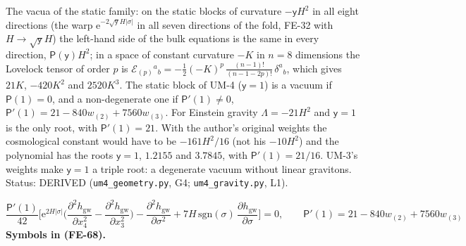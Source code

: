 \documentclass[
  10pt,
]{article}
\begin{document}
The vacua of the static family: on the static blocks of curvature
\(-\mathsf{y}H^2\) in all eight directions (the warp
\(\mathrm{e}^{-2\sqrt{\mathsf{y}}H\lvert\sigma\rvert}\) in all seven
directions of the fold, FE-32 with \(H \to \sqrt{\mathsf{y}}H\)) the
left-hand side of the bulk equations is the same in every direction,
\(\mathsf{P}(\mathsf{y})H^2\); in a space of constant curvature \(-K\)
in \(n = 8\) dimensions the Lovelock tensor of order \(p\) is
\(\mathcal{E}_{(p)}{}^a{}_b = -\frac12(-K)^p\,\frac{(n - 1)!}{(n - 1 - 2p)!}\,\delta^a{}_b\),
which gives \(21K\), \(-420K^2\) and \(2520K^3\). The static block of
UM-4 (\(\mathsf{y} = 1\)) is a vacuum if \(\mathsf{P}(1) = 0\), and a
non-degenerate one if \(\mathsf{P}'(1) \ne 0\),
\(\mathsf{P}'(1) = 21 - 840w_{(2)} + 7560w_{(3)}\). For Einstein gravity
\(\Lambda = -21H^2\) and \(\mathsf{y} = 1\) is the only root, with
\(\mathsf{P}'(1) = 21\). With the author's original weights the
cosmological constant would have to be \(-161H^2/16\) (not his
\(-10H^2\)) and the polynomial has the roots \(\mathsf{y} = 1\),
\(1.2155\) and \(3.7845\), with \(\mathsf{P}'(1) = 21/16\). UM-3's
weights make \(\mathsf{y} = 1\) a triple root: a degenerate vacuum
without linear gravitons. Status: DERIVED (\texttt{um4\_geometry.py},
G4; \texttt{um4\_gravity.py}, L1).

\[
\frac{\mathsf{P}'(1)}{42}\Big[\mathrm{e}^{2H\lvert\sigma\rvert}\Big(\frac{\partial^2h_{\mathrm{gw}}}{\partial x_4^2}
 - \frac{\partial^2h_{\mathrm{gw}}}{\partial x_3^2}\Big) - \frac{\partial^2h_{\mathrm{gw}}}{\partial\sigma^2}
 + 7H\,\mathrm{sgn}(\sigma)\,\frac{\partial h_{\mathrm{gw}}}{\partial\sigma}\Big] = 0,\qquad
\mathsf{P}'(1) = 21 - 840w_{(2)} + 7560w_{(3)} \tag{FE-68}
\] \textbf{Symbols in (FE-68).}
\end{document}
